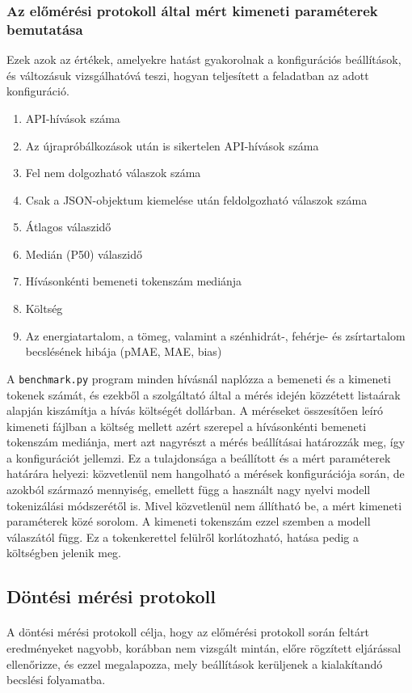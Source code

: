 \subsubsection{Az előmérési protokoll által mért kimeneti paraméterek bemutatása}
Ezek azok az értékek, amelyekre hatást gyakorolnak a konfigurációs beállítások,
és változásuk vizsgálhatóvá teszi, hogyan teljesített a feladatban az adott konfiguráció.
\begin{enumerate}
    \item API-hívások száma
    \item Az újrapróbálkozások után is sikertelen API-hívások száma
    \item Fel nem dolgozható válaszok száma
    \item Csak a JSON-objektum kiemelése után feldolgozható válaszok száma
    \item Átlagos válaszidő
    \item Medián (P50) válaszidő
    \item Hívásonkénti bemeneti tokenszám mediánja
    \item Költség
    \item Az energiatartalom, a tömeg, valamint a szénhidrát-, fehérje- és zsírtartalom
    becslésének hibája (pMAE, MAE, bias)
\end{enumerate}

A \texttt{benchmark.py} program minden hívásnál naplózza a bemeneti és a kimeneti tokenek számát, és ezekből a 
szolgáltató által a mérés idején közzétett listaárak alapján kiszámítja a hívás költségét dollárban. A 
méréseket összesítően leíró kimeneti fájlban a költség mellett azért szerepel a hívásonkénti bemeneti 
tokenszám mediánja, mert azt nagyrészt a mérés beállításai határozzák meg, így a konfigurációt jellemzi. 
Ez a tulajdonsága a beállított és a mért paraméterek határára helyezi: közvetlenül nem hangolható a 
mérések konfigurációja során, de azokból származó mennyiség, emellett függ a használt nagy nyelvi 
modell tokenizálási módszerétől is. Mivel közvetlenül nem állítható be, a mért kimeneti paraméterek 
közé sorolom. A kimeneti tokenszám ezzel szemben a modell válaszától függ. Ez a tokenkerettel felülről 
korlátozható, hatása pedig a költségben jelenik meg.

\subsection{Döntési mérési protokoll}
\label{sec:dontesi_protokoll}
\paragraph{}A döntési mérési protokoll célja, hogy az előmérési protokoll során feltárt eredményeket 
nagyobb, korábban nem vizsgált mintán, előre rögzített eljárással ellenőrizze, és ezzel megalapozza, 
mely beállítások kerüljenek a kialakítandó becslési folyamatba.

